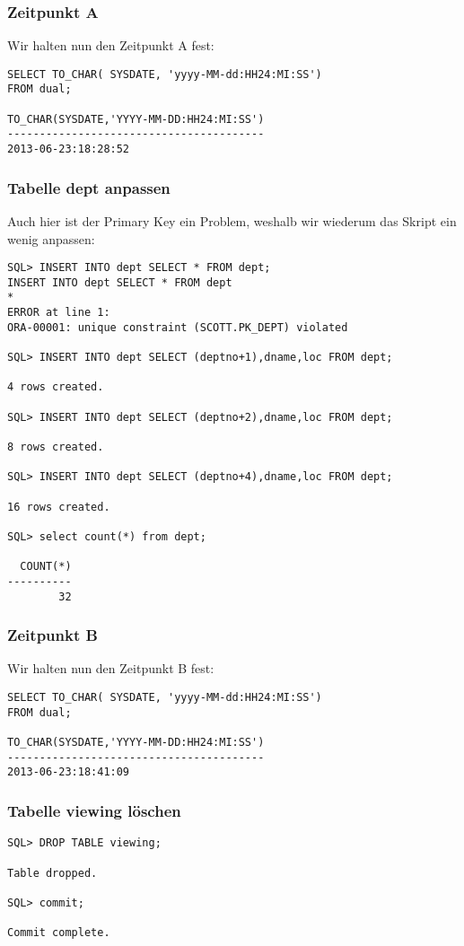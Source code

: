 \documentclass[11pt,a4paper,parskip=half]{scrartcl}
\begin{document}
\subsubsection{Zeitpunkt A}
Wir halten nun den Zeitpunkt A fest:
\begin{lstlisting}
SELECT TO_CHAR( SYSDATE, 'yyyy-MM-dd:HH24:MI:SS')
FROM dual;

TO_CHAR(SYSDATE,'YYYY-MM-DD:HH24:MI:SS')
----------------------------------------
2013-06-23:18:28:52                      
\end{lstlisting}

\subsubsection{Tabelle dept anpassen}
Auch hier ist der Primary Key ein Problem, weshalb wir wiederum das Skript ein wenig anpassen:
\begin{lstlisting}
SQL> INSERT INTO dept SELECT * FROM dept;
INSERT INTO dept SELECT * FROM dept
*
ERROR at line 1:
ORA-00001: unique constraint (SCOTT.PK_DEPT) violated

SQL> INSERT INTO dept SELECT (deptno+1),dname,loc FROM dept;

4 rows created.

SQL> INSERT INTO dept SELECT (deptno+2),dname,loc FROM dept;

8 rows created.

SQL> INSERT INTO dept SELECT (deptno+4),dname,loc FROM dept;

16 rows created.

SQL> select count(*) from dept;

  COUNT(*)
----------
        32
\end{lstlisting}

\subsubsection{Zeitpunkt B}
Wir halten nun den Zeitpunkt B fest:
\begin{lstlisting}
SELECT TO_CHAR( SYSDATE, 'yyyy-MM-dd:HH24:MI:SS')
FROM dual;

TO_CHAR(SYSDATE,'YYYY-MM-DD:HH24:MI:SS')
----------------------------------------
2013-06-23:18:41:09  
\end{lstlisting}

\subsubsection{Tabelle viewing löschen}
\begin{lstlisting}
SQL> DROP TABLE viewing;

Table dropped.

SQL> commit;

Commit complete.
\end{lstlisting}
\end{document}
